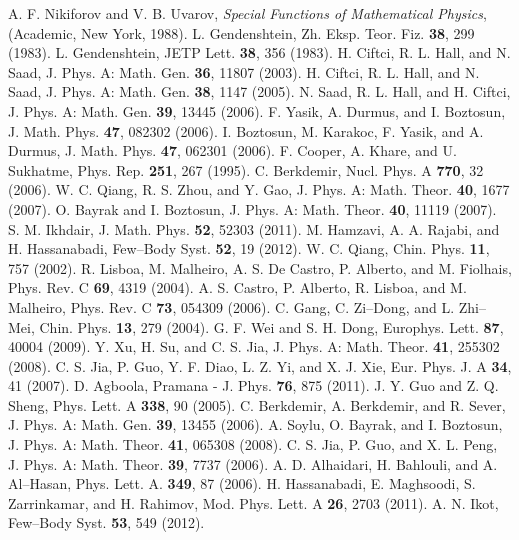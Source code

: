\documentclass[amsmath,amssymb,superscriptaddress,showkeys, showpacs, aps, nofootinbib]{revtex4}
\begin{document}
\begin{thebibliography}{99}
 A. F. Nikiforov and V. B. Uvarov, {\it Special Functions of Mathematical Physics}, (Academic, New York, 1988).
 L. Gendenshtein, Zh. Eksp. Teor. Fiz. {\bf 38}, 299 (1983).
 L. Gendenshtein, JETP Lett. {\bf 38}, 356 (1983).
 H. Ciftci, R. L. Hall, and N. Saad, J. Phys. A: Math. Gen. {\bf 36}, 11807 (2003).
 H. Ciftci, R. L. Hall, and N. Saad, J. Phys. A: Math. Gen. {\bf 38}, 1147 (2005).
 N. Saad, R. L. Hall, and H. Ciftci, J. Phys. A: Math. Gen. {\bf 39}, 13445 (2006).
 F. Yasik, A. Durmus, and I. Boztosun, J. Math. Phys. {\bf 47}, 082302 (2006).
 I. Boztosun, M. Karakoc, F. Yasik, and A. Durmus, J. Math. Phys. {\bf 47}, 062301 (2006).
 F. Cooper, A. Khare, and U. Sukhatme, Phys. Rep. {\bf 251}, 267 (1995).
 C. Berkdemir, Nucl. Phys. A {\bf 770}, 32 (2006).
 W. C. Qiang, R. S. Zhou, and Y. Gao, J. Phys. A: Math. Theor. {\bf 40}, 1677 (2007). 
 O. Bayrak and I. Boztosun, J. Phys. A: Math. Theor. {\bf 40}, 11119 (2007).
 S. M. Ikhdair, J. Math. Phys. {\bf 52}, 52303 (2011).
 M. Hamzavi, A. A. Rajabi, and H. Hassanabadi, Few--Body Syst. {\bf 52}, 19 (2012).
 W. C. Qiang, Chin. Phys. {\bf 11}, 757 (2002).
 R. Lisboa, M. Malheiro, A. S. De Castro, P. Alberto, and M. Fiolhais, Phys. Rev. C {\bf 69}, 4319 (2004). 
 A. S. Castro, P. Alberto, R. Lisboa, and M. Malheiro, Phys. Rev. C {\bf 73}, 054309 (2006).
 C. Gang, C. Zi--Dong, and L. Zhi--Mei, Chin. Phys. {\bf 13}, 279 (2004).
 G. F. Wei and S. H. Dong, Europhys. Lett. {\bf 87}, 40004 (2009).
 Y. Xu, H. Su, and C. S. Jia, J. Phys. A: Math. Theor. {\bf 41}, 255302 (2008).
 C. S. Jia, P. Guo, Y. F. Diao, L. Z. Yi, and X. J. Xie, Eur. Phys. J. A {\bf 34}, 41 (2007).
 D. Agboola, Pramana - J. Phys. {\bf 76}, 875 (2011).
 J. Y. Guo and Z. Q. Sheng, Phys. Lett. A {\bf 338}, 90 (2005).
 C. Berkdemir, A. Berkdemir, and R. Sever, J. Phys. A: Math. Gen. {\bf 39}, 13455 (2006).
 A. Soylu, O. Bayrak, and I. Boztosun, J. Phys. A: Math. Theor. {\bf 41}, 065308 (2008). 
 C. S. Jia, P. Guo, and X. L. Peng, J. Phys. A: Math. Theor. {\bf 39}, 7737 (2006).
 A. D. Alhaidari, H. Bahlouli, and A. Al--Hasan, Phys. Lett. A. {\bf 349}, 87 (2006).
 H. Hassanabadi, E. Maghsoodi, S. Zarrinkamar, and H. Rahimov, Mod. Phys. Lett. A {\bf 26}, 2703 (2011).
 A. N. Ikot, Few--Body Syst. {\bf 53}, 549 (2012).

\end{thebibliography}
\end{document}
